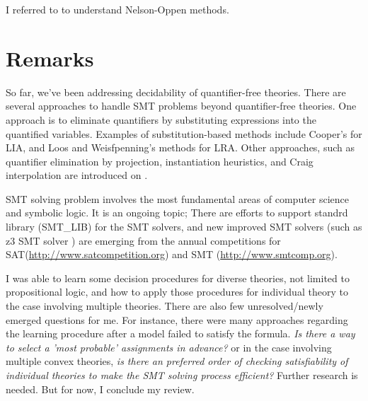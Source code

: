 \documentclass[10pt,a4paper]{article}
\begin{document}
	I referred to \cite{Dillig, nelson-oppen, Bradley, handbook} to understand Nelson-Oppen methods.
	
	\section {Remarks}
	
	So far, we've been addressing decidability of quantifier-free theories. There are several approaches to handle SMT problems beyond quantifier-free theories. One approach is to eliminate quantifiers by substituting expressions into the quantified variables. Examples of substitution-based methods include Cooper's \cite{Cooper} for LIA, and Loos and Weisfpenning's \cite{Loos} methods for LRA. Other approaches, such as quantifier elimination by projection, instantiation heuristics, and Craig interpolation are introduced on \cite{survey}.
	
	SMT solving problem involves the most fundamental areas of computer science and symbolic logic. It is an ongoing topic; There are efforts to support standrd library (SMT\_LIB) for the SMT solvers, and new improved SMT solvers (such as z3 SMT solver \cite{z3}) are emerging from the annual competitions for SAT(\url{http://www.satcompetition.org}) and SMT (\url{http://www.smtcomp.org}).  
	
	I was able to learn some decision procedures for diverse theories, not limited to propositional logic, and how to apply those procedures for individual theory to the case involving multiple theories. There are also few unresolved/newly emerged questions for me. For instance, there were many approaches regarding the learning procedure after a model failed to satisfy the formula. \textit{Is there a way to select a 'most probable' assignments in advance?} or in the case involving multiple convex theories, \textit{is there an preferred order of checking satisfiability of individual theories to make the SMT solving process efficient?} Further research is needed. But for now, I conclude my review.
		
\end{document}

